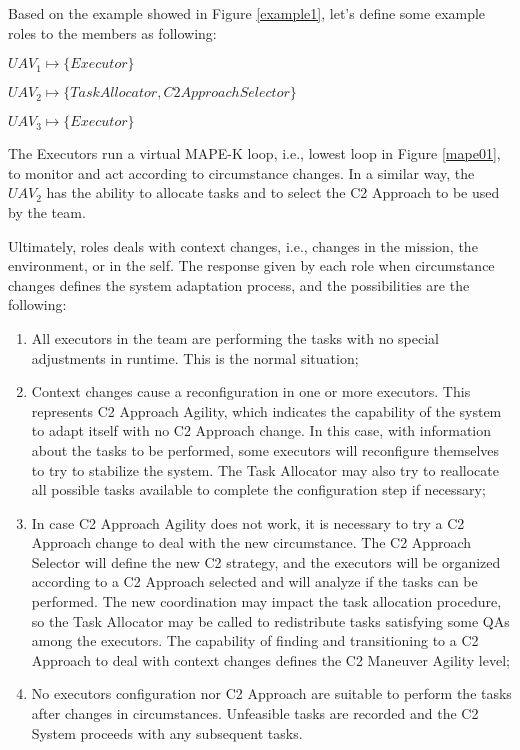 
Based on the example showed in Figure \ref{example1}, let's define some example roles to the members as following:

\hspace{4cm} $UAV_1 \mapsto \{Executor\}$

\hspace{4cm} $UAV_2 \mapsto \{Task Allocator, C2 Approach Selector\}$

\hspace{4cm} $UAV_3 \mapsto \{Executor\}$

The Executors run a virtual MAPE-K loop, i.e., lowest loop in Figure \ref{mape01}, to monitor and act according to circumstance changes. In a similar way, the $UAV_2$ has the ability to allocate tasks and to select the C2 Approach to be used by the team.

Ultimately, roles deals with context changes, i.e., changes in the mission, the environment, or in the self. The response given by each role  when circumstance changes defines the system adaptation process, and the possibilities are the following:

\begin{enumerate}
    \item All executors in the team  are performing the tasks with no special adjustments in runtime. This is the normal situation;
    \item Context changes cause a reconfiguration in one or more executors. This represents C2 Approach Agility, which indicates the capability of the system to adapt itself with no C2 Approach change. In this case, with information about the tasks to be performed, some executors will reconfigure themselves to try to stabilize the system. The Task Allocator may also try to reallocate all possible tasks available to complete the configuration step if necessary;
    \item In case C2 Approach Agility does not work, it is necessary to try a C2 Approach change to deal with the new circumstance. The C2 Approach Selector will define the new C2 strategy, and the executors will be organized according to a C2 Approach selected and will analyze if the tasks can be performed. The new coordination may impact the task allocation procedure, so the Task Allocator may be called to redistribute tasks satisfying some QAs among the executors. The capability of finding and transitioning to a C2 Approach to deal with context changes defines the C2 Maneuver Agility level;
    \item No executors configuration nor C2 Approach are suitable to perform the tasks after changes in circumstances. Unfeasible tasks are recorded and the C2 System proceeds with any subsequent tasks.
\end{enumerate}


